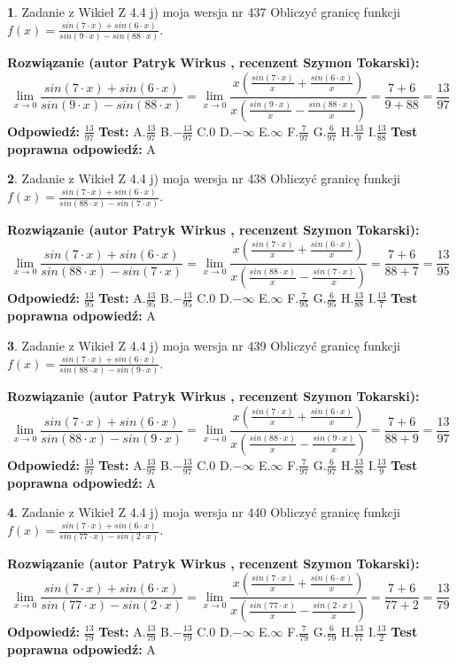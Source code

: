 \documentclass[12pt, a4paper]{article}
\theoremstyle{definition} %
\newtheorem{zad}{}
\newcommand{\zadStart}[1]{\begin{zad}#1\newline}
\newcommand{\zadStop}{\end{zad}}
\newcommand{\rozwStart}[2]{\noindent \textbf{Rozwiązanie (autor #1 , recenzent #2): }\newline}
\newcommand{\rozwStop}{\newline}
\newcommand{\odpStart}{\noindent \textbf{Odpowiedź:}\newline}
\newcommand{\odpStop}{\newline}
\newcommand{\testStart}{\noindent \textbf{Test:}\newline}
\newcommand{\testStop}{\newline}
\newcommand{\kluczStart}{\noindent \textbf{Test poprawna odpowiedź:}\newline}
\newcommand{\kluczStop}{\newline}
\begin{document}
\zadStart{Zadanie z Wikieł Z 4.4 j) moja wersja nr 437}
Obliczyć granicę funkcji $f(x)=\frac{sin(7\cdot x) +sin(6\cdot x)}{sin(9\cdot x) -sin(88\cdot x)}$.
\zadStop
\rozwStart{Patryk Wirkus}{Szymon Tokarski}
$$\lim\limits_{x\to 0}\frac{sin(7\cdot x) +sin(6\cdot x)}{sin(9\cdot x) -sin(88\cdot x)}=\lim\limits_{x\to 0}\frac{x(\frac{sin(7\cdot x)}{x}+\frac{sin(6\cdot x)}{x})}{x(\frac{sin(9\cdot x)}{x}-\frac{sin(88\cdot x)}{x})}=\frac{7+6}{9+88} = \frac{13}{97}$$
\rozwStop
\odpStart
$\frac{13}{97}$
\odpStop
\testStart
A.$\frac{13}{97}$
B.$-\frac{13}{97}$
C.$0$
D.$-\infty$
E.$\infty$
F.$\frac{7}{97}$
G.$\frac{6}{97}$
H.$\frac{13}{9}$
I.$\frac{13}{88}$
\testStop
\kluczStart
A
\kluczStop



\zadStart{Zadanie z Wikieł Z 4.4 j) moja wersja nr 438}
Obliczyć granicę funkcji $f(x)=\frac{sin(7\cdot x) +sin(6\cdot x)}{sin(88\cdot x) -sin(7\cdot x)}$.
\zadStop
\rozwStart{Patryk Wirkus}{Szymon Tokarski}
$$\lim\limits_{x\to 0}\frac{sin(7\cdot x) +sin(6\cdot x)}{sin(88\cdot x) -sin(7\cdot x)}=\lim\limits_{x\to 0}\frac{x(\frac{sin(7\cdot x)}{x}+\frac{sin(6\cdot x)}{x})}{x(\frac{sin(88\cdot x)}{x}-\frac{sin(7\cdot x)}{x})}=\frac{7+6}{88+7} = \frac{13}{95}$$
\rozwStop
\odpStart
$\frac{13}{95}$
\odpStop
\testStart
A.$\frac{13}{95}$
B.$-\frac{13}{95}$
C.$0$
D.$-\infty$
E.$\infty$
F.$\frac{7}{95}$
G.$\frac{6}{95}$
H.$\frac{13}{88}$
I.$\frac{13}{7}$
\testStop
\kluczStart
A
\kluczStop



\zadStart{Zadanie z Wikieł Z 4.4 j) moja wersja nr 439}
Obliczyć granicę funkcji $f(x)=\frac{sin(7\cdot x) +sin(6\cdot x)}{sin(88\cdot x) -sin(9\cdot x)}$.
\zadStop
\rozwStart{Patryk Wirkus}{Szymon Tokarski}
$$\lim\limits_{x\to 0}\frac{sin(7\cdot x) +sin(6\cdot x)}{sin(88\cdot x) -sin(9\cdot x)}=\lim\limits_{x\to 0}\frac{x(\frac{sin(7\cdot x)}{x}+\frac{sin(6\cdot x)}{x})}{x(\frac{sin(88\cdot x)}{x}-\frac{sin(9\cdot x)}{x})}=\frac{7+6}{88+9} = \frac{13}{97}$$
\rozwStop
\odpStart
$\frac{13}{97}$
\odpStop
\testStart
A.$\frac{13}{97}$
B.$-\frac{13}{97}$
C.$0$
D.$-\infty$
E.$\infty$
F.$\frac{7}{97}$
G.$\frac{6}{97}$
H.$\frac{13}{88}$
I.$\frac{13}{9}$
\testStop
\kluczStart
A
\kluczStop



\zadStart{Zadanie z Wikieł Z 4.4 j) moja wersja nr 440}
Obliczyć granicę funkcji $f(x)=\frac{sin(7\cdot x) +sin(6\cdot x)}{sin(77\cdot x) -sin(2\cdot x)}$.
\zadStop
\rozwStart{Patryk Wirkus}{Szymon Tokarski}
$$\lim\limits_{x\to 0}\frac{sin(7\cdot x) +sin(6\cdot x)}{sin(77\cdot x) -sin(2\cdot x)}=\lim\limits_{x\to 0}\frac{x(\frac{sin(7\cdot x)}{x}+\frac{sin(6\cdot x)}{x})}{x(\frac{sin(77\cdot x)}{x}-\frac{sin(2\cdot x)}{x})}=\frac{7+6}{77+2} = \frac{13}{79}$$
\rozwStop
\odpStart
$\frac{13}{79}$
\odpStop
\testStart
A.$\frac{13}{79}$
B.$-\frac{13}{79}$
C.$0$
D.$-\infty$
E.$\infty$
F.$\frac{7}{79}$
G.$\frac{6}{79}$
H.$\frac{13}{77}$
I.$\frac{13}{2}$
\testStop
\kluczStart
A
\kluczStop
\end{document}
